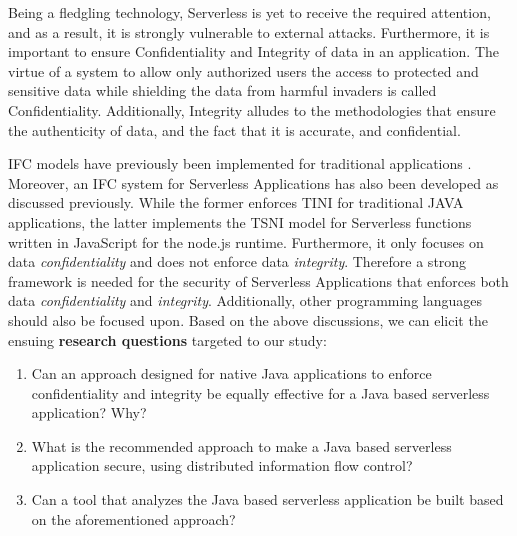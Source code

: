 Being a fledgling technology, Serverless is yet to receive the required attention, and as a result, it is strongly vulnerable to external attacks. Furthermore, it is important to ensure Confidentiality and Integrity of data in an application. The virtue of a system to allow only authorized users the access to protected and sensitive data while shielding the data from harmful invaders is called Confidentiality. Additionally, Integrity alludes to the methodologies that ensure the authenticity of data, and the fact that it is accurate, and confidential.

IFC models have previously been implemented for traditional applications \cite{Khakpour2018}. Moreover, an IFC system for Serverless Applications has also been developed \cite{Alpernas2018} as discussed previously. While the former enforces TINI for traditional JAVA applications, the latter implements the TSNI model for Serverless functions written in JavaScript for the node.js runtime. Furthermore, it only focuses on data \textit{confidentiality} and does not enforce data \textit{integrity}. Therefore a strong framework is needed for the security of Serverless Applications that enforces both data \textit{confidentiality} and \textit{integrity}. Additionally, other programming languages should also be focused upon. Based on the above discussions, we can elicit the ensuing \textbf{research questions} targeted to our study:
\begin{changemargin}{2cm}{0.5cm} 
	\begin{enumerate}[label=\textbf{RQ{{\arabic*}}:} ]
		\item
		Can an approach designed for native Java applications to enforce confidentiality and integrity be equally effective for a Java based serverless application? Why?
		\item
		What is the recommended approach to make a Java based serverless application secure, using distributed information flow control?
		\item 
		Can a tool that analyzes the Java based serverless application be built based on the aforementioned approach?
	\end{enumerate}
\end{changemargin} 